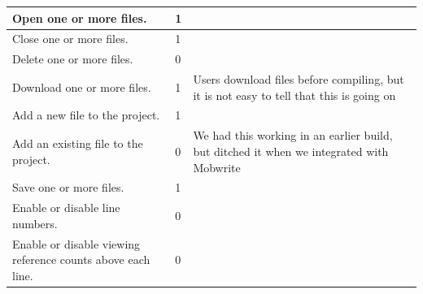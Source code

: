 \documentclass[twoside,letterpaper]{article}
\begin{document}
\begin{tabular}{|p{6cm}|p{2.5cm}|p{8cm}|}
Open one or more files.                                                                & 1                     &                                                                                                                          \\ \hline
Close one or more files.                                                               & 1                     &                                                                                                                          \\ \hline
Delete one or more files.                                                              & 0                     &                                                                                                                          \\ \hline
Download one or more files.                                                            & 1                     & Users download files before compiling, but it is not easy to tell that this is going on                                  \\ \hline
Add a new file to the project.                                                         & 1                     &                                                                                                                          \\ \hline
Add an existing file to the project.                                                   & 0                     & We had this working in an earlier build, but ditched it when we integrated with Mobwrite                                 \\ \hline
Save one or more files.                                                                & 1                     &                                                                                                                          \\ \hline
Enable or disable line numbers.                                                        & 0                     &                                                                                                                          \\ \hline
Enable or disable viewing reference counts above each line.                            & 0                     &                                                                                                                         
\\ \hline
\end{tabular}
\end{document}
